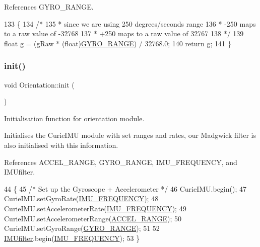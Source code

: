 References G\+Y\+R\+O\+\_\+\+R\+A\+N\+GE.


\begin{DoxyCode}
133 \{
134   \textcolor{comment}{/*}
135 \textcolor{comment}{   * since we are using 250 degrees/seconds range}
136 \textcolor{comment}{   * -250 maps to a raw value of -32768}
137 \textcolor{comment}{   * +250 maps to a raw value of 32767}
138 \textcolor{comment}{   */}
139   \textcolor{keywordtype}{float} g = (gRaw * (float)\hyperlink{_orientation_8cpp_af9a0775d43604d7410e3da3dbc90925a}{GYRO\_RANGE}) / 32768.0;
140   \textcolor{keywordflow}{return} g;
141 \}
\end{DoxyCode}
\mbox{\label{class_orientation_a317461c5c8afa8c3abf56847d4544728}} 
\subsubsection{\texorpdfstring{init()}{init()}}
{\footnotesize\ttfamily void Orientation\+::init (\begin{DoxyParamCaption}{ }\end{DoxyParamCaption})}



Initialisation function for orientation module. 

Initialises the Curie\+I\+MU module with set ranges and rates, our Madgwick filter is also initialised with this information. 

References A\+C\+C\+E\+L\+\_\+\+R\+A\+N\+GE, G\+Y\+R\+O\+\_\+\+R\+A\+N\+GE, I\+M\+U\+\_\+\+F\+R\+E\+Q\+U\+E\+N\+CY, and I\+M\+Ufilter.


\begin{DoxyCode}
44 \{
45   \textcolor{comment}{/* Set up the Gyroscope + Accelerometer */}
46   CurieIMU.begin();
47   CurieIMU.setGyroRate(\hyperlink{_orientation_8cpp_aacb21c2e16f8c38c985b8f02787a7baf}{IMU\_FREQUENCY});
48   CurieIMU.setAccelerometerRate(\hyperlink{_orientation_8cpp_aacb21c2e16f8c38c985b8f02787a7baf}{IMU\_FREQUENCY});
49   CurieIMU.setAccelerometerRange(\hyperlink{_orientation_8cpp_a16ec7011dea5773b504e875852f35fc1}{ACCEL\_RANGE});
50   CurieIMU.setGyroRange(\hyperlink{_orientation_8cpp_af9a0775d43604d7410e3da3dbc90925a}{GYRO\_RANGE});
51 
52   \hyperlink{class_orientation_a3b0d70328334e69797438ccc408806c1}{IMUfilter}.begin(\hyperlink{_orientation_8cpp_aacb21c2e16f8c38c985b8f02787a7baf}{IMU\_FREQUENCY});
53 \}
\end{DoxyCode}
\mbox{\label{class_orientation_aad568a473f999c181abac46a4d832387}} 
